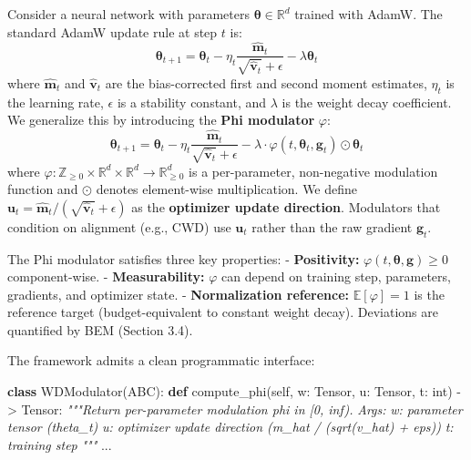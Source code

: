 \documentclass[
]{article}
\newenvironment{Shaded}{}{}
\newcommand{\BuiltInTok}[1]{\textcolor[rgb]{0.00,0.50,0.00}{#1}}
\newcommand{\CommentTok}[1]{\textcolor[rgb]{0.38,0.63,0.69}{\textit{#1}}}
\newcommand{\KeywordTok}[1]{\textcolor[rgb]{0.00,0.44,0.13}{\textbf{#1}}}
\newcommand{\NormalTok}[1]{#1}
\newcommand{\OperatorTok}[1]{\textcolor[rgb]{0.40,0.40,0.40}{#1}}
\newcommand{\VariableTok}[1]{\textcolor[rgb]{0.10,0.09,0.49}{#1}}
\begin{document}
Consider a neural network with parameters
\(\boldsymbol{\theta} \in \mathbb{R}^d\) trained with AdamW. The
standard AdamW update rule at step \(t\) is: \[
\boldsymbol{\theta}_{t+1} = \boldsymbol{\theta}_t - \eta_t \frac{\hat{\mathbf{m}}_t}{\sqrt{\hat{\mathbf{v}}_t} + \epsilon} - \lambda \boldsymbol{\theta}_t
\] where \(\hat{\mathbf{m}}_t\) and \(\hat{\mathbf{v}}_t\) are the
bias-corrected first and second moment estimates, \(\eta_t\) is the
learning rate, \(\epsilon\) is a stability constant, and \(\lambda\) is
the weight decay coefficient. We generalize this by introducing the
\textbf{Phi modulator} \(\varphi\): \[
\boldsymbol{\theta}_{t+1} = \boldsymbol{\theta}_t - \eta_t \frac{\hat{\mathbf{m}}_t}{\sqrt{\hat{\mathbf{v}}_t} + \epsilon} - \lambda \cdot \varphi(t, \boldsymbol{\theta}_t, \mathbf{g}_t) \odot \boldsymbol{\theta}_t
\] where
\(\varphi : \mathbb{Z}_{\geq 0} \times \mathbb{R}^d \times \mathbb{R}^d \to \mathbb{R}^d_{\geq 0}\)
is a per-parameter, non-negative modulation function and \(\odot\)
denotes element-wise multiplication. We define
\(\mathbf{u}_t = \hat{\mathbf{m}}_t / (\sqrt{\hat{\mathbf{v}}_t} + \epsilon)\)
as the \textbf{optimizer update direction}. Modulators that condition on
alignment (e.g., CWD) use \(\mathbf{u}_t\) rather than the raw gradient
\(\mathbf{g}_t\).

The Phi modulator satisfies three key properties: - \textbf{Positivity:}
\(\varphi(t, \boldsymbol{\theta}, \mathbf{g}) \geq 0\) component-wise. -
\textbf{Measurability:} \(\varphi\) can depend on training step,
parameters, gradients, and optimizer state. - \textbf{Normalization
reference:} \(\mathbb{E}[\varphi] = 1\) is the reference target
(budget-equivalent to constant weight decay). Deviations are quantified
by BEM (Section 3.4).

The framework admits a clean programmatic interface:

\begin{Shaded}
\begin{Highlighting}[]
\KeywordTok{class}\NormalTok{ WDModulator(ABC):}
    \KeywordTok{def}\NormalTok{ compute\_phi(}\VariableTok{self}\NormalTok{, w: Tensor, u: Tensor, t: }\BuiltInTok{int}\NormalTok{) }\OperatorTok{{-}\textgreater{}}\NormalTok{ Tensor:}
        \CommentTok{"""Return per{-}parameter modulation phi in [0, inf).}
\CommentTok{        Args:}
\CommentTok{            w: parameter tensor (theta\_t)}
\CommentTok{            u: optimizer update direction (m\_hat / (sqrt(v\_hat) + eps))}
\CommentTok{            t: training step}
\CommentTok{        """}
\NormalTok{        ...}
\end{Highlighting}
\end{Shaded}
\end{document}
